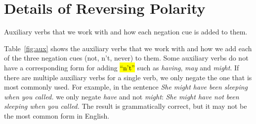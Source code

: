 \section{Details of Reversing Polarity}
\label{app:reversing}

\begin{table*}
    \centering
    
    \caption{
        Auxiliary verbs that we work with and how each negation cue is added to them.
        \label{fig:aux}
        }
\end{table*}

Table~\ref{fig:aux} shows the auxiliary verbs that we work with 
and how we add each of the three negation cues 
(not, n't, never) to them.
Some auxiliary verbs do not have a corresponding form for adding \hl{``n't''}
such as \emph{having}, \emph{may} and \emph{might}.
If there are multiple auxiliary verbs for a single verb,
we only negate the one that is most commonly used.
For example, in the sentence \emph{She might have been sleeping when you called.}
we only negate \emph{have} and not \emph{might}: \emph{She might have not been sleeping when you called.}
The result is grammatically correct, but it may not be the most common form in English.